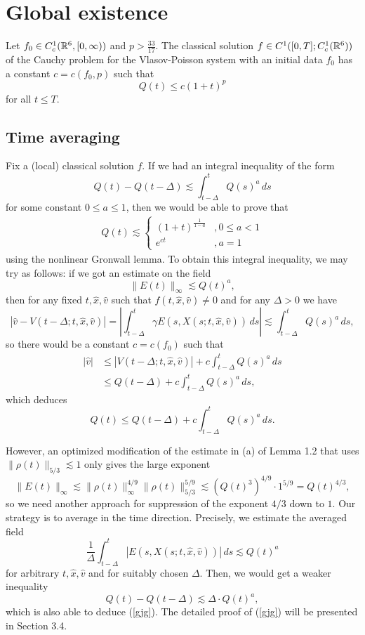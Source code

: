 \documentclass[12pt]{article}
\begin{document}
\section{Global existence}



\begin{thm*}[Schaeffer, 1991]
Let $f_0\in C_c^1(\mathbb{R}^6,[0,\infty))$ and $p>\frac{33}{17}$.
The classical solution $f\in C^1([0,T];C_c^1(\mathbb{R}^6))$ of the Cauchy problem for the Vlasov-Poisson system with an initial data $f_0$ has a constant $c=c(f_0,p)$ such that
\[Q(t)\le c(1+t)^p\]
for all $t\le T$.
\end{thm*}

\subsection{Time averaging}
Fix a (local) classical solution $f$.
If we had an integral inequality of the form
\[Q(t)-Q(t-\Delta)\lesssim\int_{t-\Delta}^tQ(s)^a\,ds\]
for some constant $0\le a\le1$, then we would be able to prove that
\begin{align}\label{gjg}
Q(t)\lesssim\begin{cases}(1+t)^{\frac1{1-a}}&,0\le a<1\\e^{ct}&,a=1\end{cases}
\end{align}
using the nonlinear Gronwall lemma.
To obtain this integral inequality, we may try as follows: if we got an estimate on the field
\[\|E(t)\|_\infty\lesssim Q(t)^a,\]
then for any fixed $t,\hat x,\hat v$ such that $f(t,\hat x,\hat v)\ne0$ and for any $\Delta>0$ we have
\[|\hat v-V(t-\Delta;t,\hat x,\hat v)|=|\int_{t-\Delta}^t\gamma E(s,X(s;t,\hat x,\hat v))\,ds|\lesssim\int_{t-\Delta}^tQ(s)^a\,ds,\]
so there would be a constant $c=c(f_0)$ such that
\begin{align*}
|\hat v|&\le|V(t-\Delta;t,\hat x,\hat v)|+c\int_{t-\Delta}^tQ(s)^a\,ds\\
&\le Q(t-\Delta)+c\int_{t-\Delta}^tQ(s)^a\,ds,
\end{align*}
which deduces
\[Q(t)\le Q(t-\Delta)+c\int_{t-\Delta}^tQ(s)^a\,ds.\]

However, an optimized modification of the estimate in (a) of Lemma 1.2 that uses $\|\rho(t)\|_{5/3}\lesssim1$ only gives the large exponent
\[\|E(t)\|_\infty\lesssim\|\rho(t)\|_\infty^{4/9}\|\rho(t)\|_{5/3}^{5/9}\lesssim(Q(t)^3)^{4/9}\cdot1^{5/9}=Q(t)^{4/3},\]
so we need another approach for suppression of the exponent $4/3$ down to $1$.
Our strategy is to average in the time direction.
Precisely, we estimate the averaged field
\[\frac1\Delta\int_{t-\Delta}^t|E(s,X(s;t,\hat x,\hat v))|\,ds\lesssim Q(t)^a\]
for arbitrary $t,\hat x,\hat v$ and for suitably chosen $\Delta$.
Then, we would get a weaker inequality
\[Q(t)-Q(t-\Delta)\lesssim \Delta\cdot Q(t)^a,\]
which is also able to deduce (\ref{gjg}).
The detailed proof of (\ref{gjg}) will be presented in Section 3.4.
\end{document}
